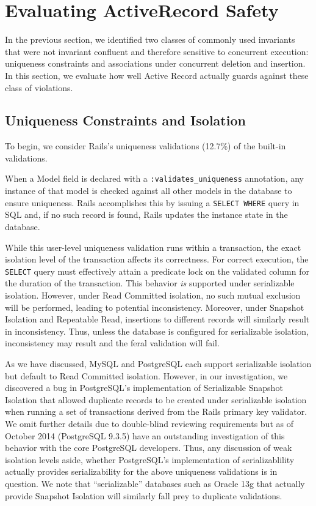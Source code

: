 
\section{Evaluating ActiveRecord Safety}
\label{sec:evaluation}

In the previous section, we identified two classes of commonly used
invariants that were not invariant confluent and therefore sensitive
to concurrent execution: uniqueness constraints and associations under
concurrent deletion and insertion. In this section, we evaluate
how well Active Record actually guards against these class of
violations. 

\subsection{Uniqueness Constraints and Isolation}

To begin, we consider Rails's uniqueness validations (12.7\%) of the
built-in validations.

When a Model field is declared with a \texttt{:validates\_uniqueness}
annotation, any instance of that model is checked against all other
models in the database to ensure uniqueness. Rails accomplishes this
by issuing a \texttt{SELECT WHERE} query in SQL and, if no such record
is found, Rails updates the instance state in the database.

While this user-level uniqueness validation runs within a transaction,
the exact isolation level of the transaction affects its
correctness. For correct execution, the \texttt{SELECT} query must
effectively attain a predicate lock on the validated column for the
duration of the transaction. This behavior \textit{is} supported under
serializable isolation. However, under Read Committed isolation, no
such mutual exclusion will be performed, leading to potential
inconsistency. Moreover, under Snapshot Isolation and Repeatable Read,
insertions to different records will similarly result in
inconsistency. Thus, unless the database is configured for
serializable isolation, inconsistency may result and the feral
validation will fail.

As we have discussed, MySQL and PostgreSQL each support serializable
isolation but default to Read Committed isolation. However, in our
investigation, we discovered a bug in PostgreSQL's implementation of
Serializable Snapshot Isolation that allowed duplicate records to be
created under serializable isolation when running a set of
transactions derived from the Rails primary key validator. We omit
further details due to double-blind reviewing requirements but as of
October 2014 (PostgreSQL 9.3.5) have an outstanding investigation of
this behavior with the core PostgreSQL developers. Thus, any
discussion of weak isolation levels aside, whether PostgreSQL's
implementation of serializablility actually provides serializability
for the above uniqueness validations is in question. We note
that ``serializable'' databases such as Oracle 13g that actually
provide Snapshot Isolation will similarly fall prey to duplicate
validations.

